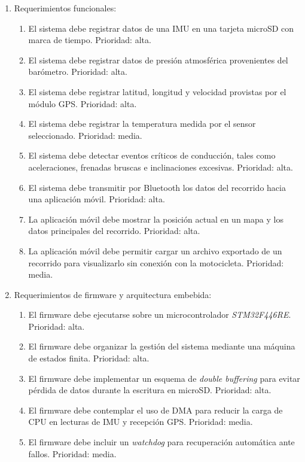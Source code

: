 \documentclass[
11pt, %
]{charter}
\begin{document}
\begin{enumerate}
	\item Requerimientos funcionales:
		\begin{enumerate}
			\item El sistema debe registrar datos de una IMU en una tarjeta microSD con marca de tiempo. Prioridad: alta.
			\item El sistema debe registrar datos de presión atmosférica provenientes del barómetro. Prioridad: alta.
			\item El sistema debe registrar latitud, longitud y velocidad provistas por el módulo GPS. Prioridad: alta.
			\item El sistema debe registrar la temperatura medida por el sensor seleccionado. Prioridad: media.
			\item El sistema debe detectar eventos críticos de conducción, tales como aceleraciones, frenadas bruscas e inclinaciones excesivas. Prioridad: alta.
			\item El sistema debe transmitir por Bluetooth los datos del recorrido hacia una aplicación móvil. Prioridad: alta.
			\item La aplicación móvil debe mostrar la posición actual en un mapa y los datos principales del recorrido. Prioridad: alta.
			\item La aplicación móvil debe permitir cargar un archivo exportado de un recorrido para visualizarlo sin conexión con la motocicleta. Prioridad: media.
		\end{enumerate}
	\item Requerimientos de firmware y arquitectura embebida:
		\begin{enumerate}
			\item El firmware debe ejecutarse sobre un microcontrolador \textit{STM32F446RE}. Prioridad: alta.
			\item El firmware debe organizar la gestión del sistema mediante una máquina de estados finita. Prioridad: alta.
			\item El firmware debe implementar un esquema de \textit{double buffering} para evitar pérdida de datos durante la escritura en microSD. Prioridad: alta.
			\item El firmware debe contemplar el uso de DMA para reducir la carga de CPU en lecturas de IMU y recepción GPS. Prioridad: media.
			\item El firmware debe incluir un \textit{watchdog} para recuperación automática ante fallos. Prioridad: media.
		\end{enumerate}

\end{enumerate}
\end{document}
